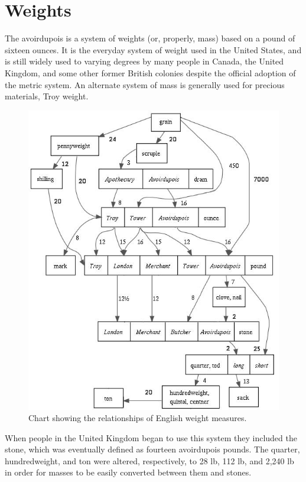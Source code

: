 \documentclass{tufte-book}
\def\SetInBetween#1{\def\between{#1}}
\begin{document}
\SetInBetween{ = }

\makeatother

\chapter{Weights}

The avoirdupois is a system of weights (or, properly, mass) based on a pound of sixteen ounces. It is the everyday system of weight used in the United States, and is still widely used to varying degrees by many people in Canada, the United Kingdom, and some other former British colonies despite the official adoption of the metric system. An alternate system of mass is generally used for precious materials, Troy weight.

\begin{figure}[p]
\includegraphics[width=1.2\linewidth]{./graphics/englishweights}
\caption{Chart showing the relationships of English weight measures.}
\end{figure}

When people in the United Kingdom began to use this system they included the stone, which was eventually defined as fourteen avoirdupois pounds. The quarter, hundredweight, and ton were altered, respectively, to 28 lb, 112 lb, and 2,240 lb in order for masses to be easily converted between them and stones. 
\end{document}
